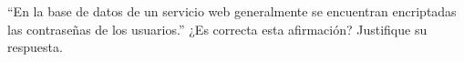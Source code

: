 ``En la base de datos de un servicio web generalmente se encuentran
encriptadas las contraseñas de los usuarios.'' ¿Es correcta esta
afirmación? Justifique su respuesta.

